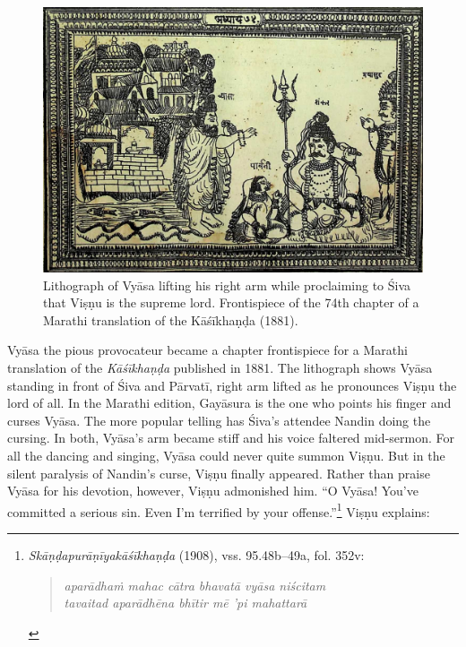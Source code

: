 \begin{figure}[ht!]\label{fig2}\centering

\includegraphics[width=\textwidth]{images/figure-02.jpg}
\caption{Lithograph of Vyāsa lifting his right arm while proclaiming to Śiva that Viṣṇu is the supreme lord. Frontispiece of the 74th chapter of a Marathi translation of the Kāśīkhaṇḍa (1881).}

\end{figure}


Vyāsa the pious provocateur became a chapter frontispiece for a Marathi translation of the \emph{{Kāśīkhaṇḍa}} published in 1881. The lithograph shows Vyāsa standing in front of Śiva and Pārvatī, right arm lifted as he pronounces Viṣṇu the lord of all. In the Marathi edition, Gayāsura is the one who points his finger and curses Vyāsa. The more popular telling has Śiva’s attendee Nandin doing the cursing. In both, Vyāsa’s arm became stiff and his voice faltered mid-sermon. For all the dancing and singing, Vyāsa could never quite summon Viṣṇu. But in the silent paralysis of Nandin’s curse, Viṣṇu finally appeared. Rather than praise Vyāsa for his devotion, however, Viṣṇu admonished him. “O Vyāsa! You’ve committed a serious sin. Even I’m terrified by your offense.”\footnote{%
\emph{{Skāṇḍapurāṇīyakāśīkhaṇḍa}} (1908), vss. 95.48b–49a, fol. 352v:

\vspace{-1.5ex}\begin{quote}\raggedright
      \emph{aparādhaṁ mahac cātra bhavatā vyāsa niścitam}\\
\emph{tavaitad aparādhēna bhītir mē ’pi mahattarā}\end{quote}\vspace{-1.5ex}
      }
 Viṣṇu explains: 

